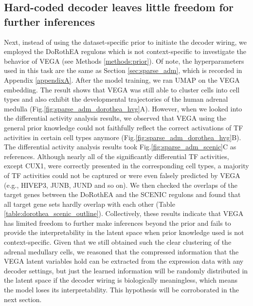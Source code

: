 \subsection{Hard-coded decoder leaves little freedom for further inferences}
Next, instead of using the dataset-specific prior to initiate the decoder wiring, we employed the DoRothEA\cite{Garcia-Alonso2019} regulons which is not context-specific to investigate the behavior of VEGA (see Methods \ref{methods:prior}). Of note, the hyperparameters used in this task are the same as Section \ref{sec:sparse_adm}, which is recorded in Appendix \ref{appendixA}. After the model training, we ran UMAP on the VEGA embedding. The result shows that VEGA was still able to cluster cells into cell types and also exhibit the developmental trajectories of the human adrenal medulla (Fig.\ref{fig:sparse_adm_dorothea_hvg}A). However, when we looked into the differential activity analysis results, we observed that VEGA using the general prior knowledge could not faithfully reflect the correct activations of TF activities in certain cell types anymore (Fig.\ref{fig:sparse_adm_dorothea_hvg}B). The differential activity analysis results took Fig.\ref{fig:sparse_adm_scenic}C as references. Although nearly all of the significantly differential TF activities, except CUX1, were correctly presented in the corresponding cell types, a majority of TF activities could not be captured or were even falsely predicted by VEGA (e.g., HIVEP3, JUNB, JUND and so on). We then checked the overlaps of the target genes between the DoRothEA and the SCENIC regulons and found that all target gene sets hardly overlap with each other (Table \ref{table:dorothea_scenic_outline}). Collectively, these results indicate that VEGA has limited freedom to further make inferences beyond the prior and fails to provide the interpretability in the latent space when prior knowledge used is not context-specific. Given that we still obtained such the clear clustering of the adrenal medullary cells, we reasoned that the compressed information that the VEGA latent variables hold can be extracted from the expression data with any decoder settings, but just the learned information will be randomly distributed in the latent space if the decoder wiring is biologically meaningless, which means the model loses its interpretability. This hypothesis will be corroborated in the next section.

\newpage

